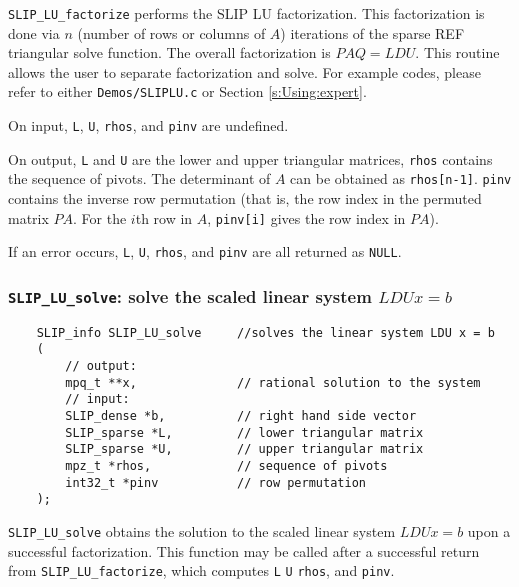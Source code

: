 \documentclass[12pt]{article}
\theoremstyle{definition}
\begin{document}
\verb|SLIP_LU_factorize| performs the SLIP LU factorization. This factorization
is done via $n$ (number of rows or columns of $A$) iterations of the sparse
REF triangular solve function. The overall factorization is $PAQ = LDU$.  This
routine allows the user to separate factorization and solve. For example codes,
please refer to either \verb|Demos/SLIPLU.c| or Section \ref{s:Using:expert}.

On input, \verb|L|, \verb|U|, \verb|rhos|, and \verb|pinv| are undefined.

On output, \verb|L| and \verb|U| are the lower and upper triangular matrices,
\verb|rhos| contains the sequence of pivots. The determinant of $A$ can be
obtained as \verb|rhos[n-1]|. \verb|pinv| contains the inverse row permutation
(that is, the row index in the permuted matrix $PA$. For the $i$th row in $A$,
\verb|pinv[i]| gives the row index in $PA$).

If an error occurs, \verb|L|, \verb|U|, \verb|rhos|, and \verb|pinv| are all
returned as \verb|NULL|.

\cprotect\subsubsection{\verb|SLIP_LU_solve|: solve the scaled linear system $LDUx=b$}
\label{ss:SLIP_LU_solve}

\begin{mdframed}[userdefinedwidth=6in]
{\footnotesize
\begin{verbatim}
    SLIP_info SLIP_LU_solve     //solves the linear system LDU x = b
    (
        // output:
        mpq_t **x,              // rational solution to the system
        // input:
        SLIP_dense *b,          // right hand side vector
        SLIP_sparse *L,         // lower triangular matrix
        SLIP_sparse *U,         // upper triangular matrix
        mpz_t *rhos,            // sequence of pivots
        int32_t *pinv           // row permutation
    );
\end{verbatim}
} \end{mdframed}

\verb|SLIP_LU_solve| obtains the solution to the scaled linear system $LDUx=b$
upon a successful factorization.  This function may be called after a
successful return from \verb|SLIP_LU_factorize|, which computes \verb|L|
\verb|U| \verb|rhos|, and \verb|pinv|. 
\end{document}
